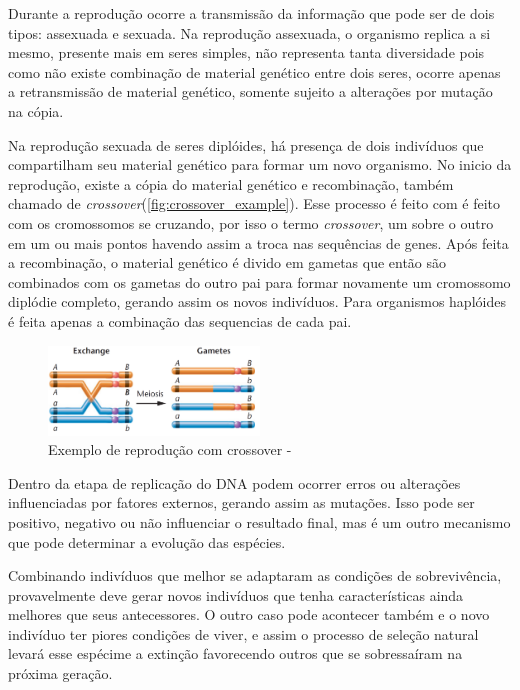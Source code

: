 Durante a reprodução ocorre a transmissão da informação que pode ser de dois tipos: assexuada e sexuada. Na reprodução assexuada, o organismo replica a si mesmo, presente mais em seres simples, não representa tanta diversidade pois como não existe combinação de material genético entre dois seres, ocorre apenas a retransmissão de material genético, somente sujeito a alterações por mutação na cópia.

Na reprodução sexuada de seres diplóides, há presença de dois indivíduos que compartilham seu material genético para formar um novo organismo. No inicio da reprodução, existe a cópia do material genético e recombinação, também chamado de \textit{crossover}(\autoref{fig:crossover_example}). Esse processo é feito com é feito com os cromossomos se cruzando, por isso o termo \textit{crossover},  um sobre o outro em um ou mais pontos havendo assim a troca nas sequências de genes. Após feita a recombinação, o material genético é divido em gametas que então são combinados com os gametas do outro pai para formar novamente um cromossomo diplódie completo, gerando assim os novos indivíduos. Para organismos haplóides é feita apenas a combinação das sequencias de cada pai.

\begin{figure}
	\begin{center}
	\includegraphics[width=0.5\textwidth]{imagens/cross_over.png}
	\caption{Exemplo de reprodução com crossover - \cite{Klug2011}}
	\label{fig:crossover_example}
	\end{center}
\end{figure}


Dentro da etapa de replicação do DNA podem ocorrer erros ou alterações influenciadas por fatores externos, gerando assim as mutações. Isso pode ser positivo, negativo ou não influenciar o resultado final, mas é um outro mecanismo que pode determinar a evolução das espécies.   

Combinando indivíduos que melhor se adaptaram as condições de sobrevivência, provavelmente deve gerar novos indivíduos que tenha características ainda melhores que seus antecessores. O outro caso pode acontecer também e o novo indivíduo ter piores condições de viver, e assim o processo de seleção natural levará esse espécime a extinção favorecendo outros que se sobressaíram na próxima geração.

